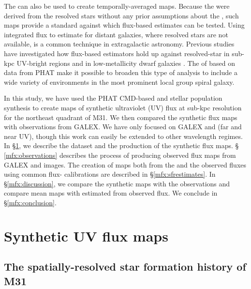 \documentclass[iop, tighten]{emulateapj}
\begin{document}
The \citet{Lewis:2014}  can also be used to create temporally-averaged
\sfr{} maps. Because the  were derived from the resolved stars without
any prior assumptions about the , such maps provide a standard against
which flux-based \sfr{} estimates \citep[e.g., using any of the calibrations
from][]{Kennicutt:2012} can be tested. Using integrated flux to estimate
 for distant galaxies, where resolved stars are not available, is a
common technique in extragalactic astronomy. Previous studies have investigated
how flux-based \sfr{} estimators hold up against resolved-star  in
sub-kpc UV-bright regions \citep{Simones:2014} and in low-metallicity dwarf
galaxies \citep{McQuinn:2014}. The  of \citet{Lewis:2014} based on data
from PHAT make it possible to broaden this type of analysis to include a wide
variety of environments in the most prominent local group spiral galaxy.

In this study, we have used the PHAT CMD-based  and stellar population
synthesis to create maps of synthetic ultraviolet (UV) flux at sub-kpc
resolution for the northeast quadrant of M31. We then compared the synthetic
flux maps with observations from GALEX. We have only focused on GALEX \fuv{}
and \nuv{} (far and near UV), though this work can easily be extended to other
wavelength regimes. In \S \ref{mfx:syntheticfluxmaps}, we describe the \sfh{}
dataset and the production of the synthetic flux maps. \S
\ref{mfx:observations} describes the process of producing observed flux maps
from GALEX \fuv{} and \nuv{} images. The creation of \sfr{} maps both from the
 and the observed fluxes using common flux-\sfr{} calibrations are
described in \S \ref{mfx:sfrestimates}. In \S \ref{mfx:discussion}, we compare
the synthetic maps with the observations and compare mean \sfr{} maps with
 estimated from observed flux. We conclude in \S \ref{mfx:conclusion}.








\section{Synthetic UV flux maps}\label{mfx:syntheticfluxmaps}



\subsection{The spatially-resolved star formation history of M31}
\end{document}
